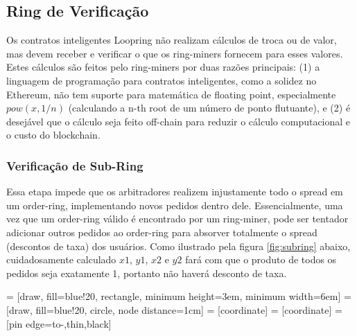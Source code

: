 \documentclass[UTF8,nofonts]{article}
\makeatletter
\newenvironment{figurehere}
 {\def\@captype{figure}}
 {}
\makeatother
\begin{document}
\begin{multicols}{2}
\subsection{Ring de Verificação\label{sec:ring_verification}}

Os contratos inteligentes Loopring não realizam cálculos de troca ou de valor, mas devem receber e verificar o que os ring-miners fornecem para esses valores. Estes cálculos são feitos pelo ring-miners por duas razões principais: (1) a linguagem de programação para contratos inteligentes, como a solidez \cite{dannen2017introducing} no Ethereum, não tem suporte para matemática de floating point, especialmente $pow(x, 1/n)$ (calculando a n-th root de um número de ponto flutuante), e (2) é desejável que o cálculo seja feito off-chain para reduzir o cálculo computacional e o custo do blockchain.


\subsubsection{Verificação de Sub-Ring\label{sec:sub_ring_check}}

Essa etapa impede que os arbitradores realizem injustamente todo o spread em um order-ring, implementando novos pedidos dentro dele. Essencialmente, uma vez que um order-ring válido é encontrado por um ring-miner, pode ser tentador adicionar outros pedidos ao order-ring para absorver totalmente o spread (descontos de taxa) dos usuários. Como ilustrado pela figura \ref{fig:subring} abaixo, cuidadosamente calculado $x1$, $y1$, $x2$ e $y2$ fará com que o produto de todos os pedidos seja exatamente 1, portanto não haverá desconto de taxa.

\begin{center}
\begin{figurehere}
\centering
{} = [draw, fill=blue!20, rectangle, 
    minimum height=3em, minimum width=6em]
 = [draw, fill=blue!20, circle, node distance=1cm]
 = [coordinate]
 = [coordinate]
 = [pin edge={to-,thin,black}]

\begin{tikzpicture}[
    auto, 
    node distance=2cm,
    >=latex',
    font=\bfseries\footnotesize\sffamily,
    order/.style={
		scale=0.7,
		rectangle,
		rounded corners,
		draw=black, 
		text centered,
		minimum height=12mm,
		fill=white
	},
	label/.style={
		scale=0.7
	}
  ]


\end{tikzpicture}
\end{figurehere}
\end{center}
\end{multicols}
\end{document}
